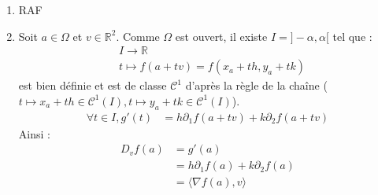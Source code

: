\documentclass[../main.tex]{subfiles}
\begin{document}
\begin{enumerate}
    \item RAF
    \item Soit $a\in \Omega$ et $v\in \mathbb{R}^2$. Comme $\Omega$ est ouvert, il existe $I = ]-\alpha, \alpha[$ tel que : 
    \begin{align*}
        &I\to \mathbb{R} \\
        &t\mapsto f(a + tv) = f(x_a + th, y_a + tk)
    \end{align*}
    est bien définie et est de classe $\mathcal{C}^1$ d'après la règle de la chaîne ($t\mapsto x_a + th\in \mathcal{C}^1(I), t\mapsto y_a + tk\in \mathcal{C}^1(I)$). 
    \begin{align*}
        \forall t\in I, g'(t) &= h \partial_1 f(a + tv) + k \partial_2 f(a + tv)
    \end{align*}
    Ainsi : 
    \begin{align*}
        D_v f(a) &= g'(a) \\
        &= h \partial_1 f(a) + k \partial_2 f(a) \\
        &= \langle \nabla f(a), v\rangle
    \end{align*}


\end{enumerate}
\end{document}
